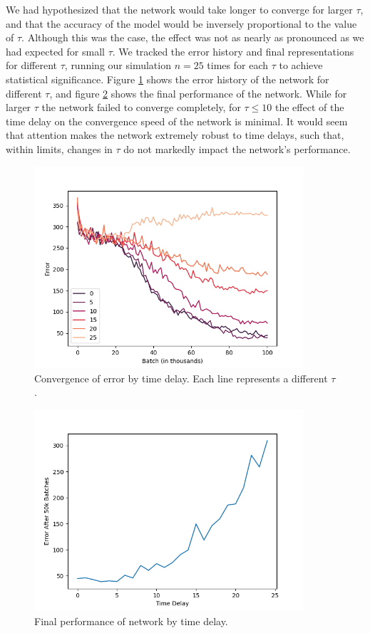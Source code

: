 \documentclass[12pt]{article}
\begin{document}
We had hypothesized that the network would take longer to converge for larger $\tau$, and that the accuracy of the model would be inversely proportional to the value of $\tau$. Although this was the case, the effect was not as nearly as pronounced as we had expected for small $\tau$. We tracked the error history and final representations for different $\tau$, running our simulation $n=25$ times for each $\tau$ to achieve statistical significance. Figure \ref{fig:tau_convergence_speed} shows the error history of the network for different $\tau$, and figure \ref{fig:tau_final_performance} shows the final performance of the network. While for larger $\tau$ the network failed to converge completely, for $\tau\leq 10$ the effect of the time delay on the convergence speed of the network is minimal. It would seem that attention makes the network extremely robust to time delays, such that, within limits, changes in $\tau$ do not markedly impact the network's performance.

\begin{figure}
	\includegraphics[width=10cm]{averaged_error_by_tau_figure}
	\centering
	\caption{Convergence of error by time delay. Each line represents a different $\tau$.}
	\label{fig:tau_convergence_speed}
\end{figure}

\begin{figure}
	\includegraphics[width=10cm]{final_performance_by_tau}\centering
	\caption{Final performance of network by time delay.}
	\label{fig:tau_final_performance}
\end{figure}
\end{document}
